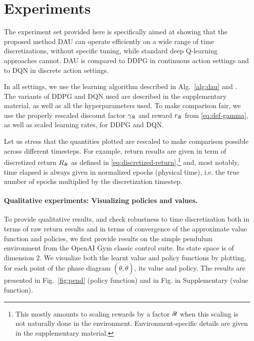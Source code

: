 \section{Experiments}
\label{sec:exp}

The experiment set provided here is specifically aimed at showing that
the proposed method DAU can operate efficiently on a wide range of time
discretizations, without specific tuning, while standard deep Q-learning
approaches cannot. DAU is compared to DDPG in continuous action settings and to DQN in
discrete action settings. 

In all settings, we use the learning algorithm described in
Alg.~\ref{alg:dau} and . The variants of DDPG and DQN
used are described in the supplementary material, as well as all the hyperparameters
used. To make comparison fair, we use the properly rescaled discount
factor $\gamma_{\delta\hspace{-.1em}t}$ and reward $r_{\delta\hspace{-.1em}t}$ from \eqref{eq:def-gamma},
as well as scaled learning rates, for DDPG and DQN. 

Let us stress that the quantities plotted are rescaled to make comparison
possible across different timesteps. For example,
return results are given in term of discretized return $R_{\delta\hspace{-.1em}t}$ as defined in \eqref{eq:discretized-return},\footnote{This mostly amounts to scaling rewards
by a factor ${\delta\hspace{-.1em}t}$ when this scaling is not naturally done in the environment. Environment-specific
details are given in the supplementary material.} and, most notably, time elapsed is always given in
normalized epochs (physical time), i.e. the true number of epochs multiplied by the
discretization timestep.


\paragraph{Qualitative experiments: Visualizing policies and values.}
To provide qualitative results, and check robustness to time
discretization both in terms of raw return results and in terms
of convergence of the approximate value function and policies, we first provide results on the simple pendulum environment
from the OpenAI Gym classic control suite.  Its state space is of
dimension $2$. We visualize both the learnt value and policy functions by
plotting, for each point of the phase diagram $(\theta, \dot{\theta})$,
its value and policy. The results are presented in
Fig.~\ref{fig:pend} (policy function) and in Fig. in
Supplementary  (value function).

